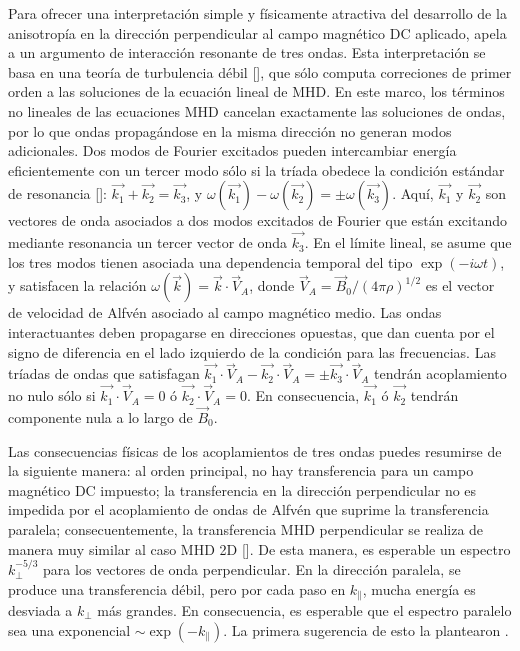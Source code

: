 Para ofrecer una interpretación simple y físicamente atractiva del
desarrollo de la anisotropía en la dirección perpendicular al campo
magnético DC aplicado, \cite{shebalin_anisotropy_1983} apela
a un argumento de interacción resonante de tres ondas. Esta
interpretación se basa en una teoría de turbulencia débil
[\cite{zakharov_kolmogorov_1992}], que sólo computa correciones de
primer orden a las soluciones de la ecuación lineal de MHD. En este
marco, los términos no lineales de las ecuaciones MHD cancelan
exactamente las soluciones de ondas, por lo que ondas propagándose en
la misma dirección no generan modos adicionales. Dos modos de Fourier
excitados pueden intercambiar energía eficientemente con un tercer
modo sólo si la tríada obedece la condición estándar de resonancia
[\cite{montgomery_anisotropic_1995}]: $\vec{k_1} + \vec{k_2} =
\vec{k_3}$, y $\omega(\vec{k_1}) - \omega(\vec{k_2}) = \pm
\omega(\vec{k_3})$. Aquí, $\vec{k_1}$ y $\vec{k_2}$ son vectores de
onda asociados a dos modos excitados de Fourier que están excitando
mediante resonancia un tercer vector de onda $\vec{k_3}$. En el límite
lineal, se asume que los tres modos tienen asociada una dependencia
temporal del tipo $\exp(-i\omega t)$, y satisfacen la relación
$\omega(\vec{k}) = \vec{k}\cdot\vec{V}_A$, donde $\vec{V}_A =
\vec{B}_0/(4\pi\rho)^{1/2}$ es el vector de velocidad de Alfv\'en
asociado al campo magnético medio. Las ondas interactuantes deben
propagarse en direcciones opuestas, que dan cuenta por el signo de
diferencia en el lado izquierdo de la condición para las
frecuencias. Las tríadas de ondas que satisfagan $\vec{k_1}\cdot
\vec{V}_A - \vec{k_2}\cdot \vec{V}_A = \pm \vec{k_3}\cdot \vec{V}_A$
tendrán acoplamiento no nulo sólo si $\vec{k_1}\cdot \vec{V}_A = 0$ ó
$\vec{k_2}\cdot \vec{V}_A = 0$. En consecuencia, $\vec{k_1}$ ó
$\vec{k_2}$ tendrán componente nula a lo largo de $\vec{B}_0$.

Las consecuencias físicas de los acoplamientos de tres ondas puedes
resumirse de la siguiente manera: al orden principal, no hay
transferencia para un campo magnético DC impuesto; la transferencia en
la dirección perpendicular no es impedida por el acoplamiento de ondas
de Alfv\'en que suprime la transferencia paralela; consecuentemente,
la transferencia MHD perpendicular se realiza de manera muy similar al
caso MHD 2D [\cite{fyfe_dissipative_1977}]. De esta manera, es esperable
un espectro $k_\perp^{-5/3}$ para los vectores de onda
perpendicular. En la dirección paralela, se produce una transferencia
débil, pero por cada paso en $k_\parallel$, mucha energía es desviada
a $k_\perp$ más grandes. En consecuencia, es esperable que el espectro
paralelo sea una exponencial $\sim \exp(-k_\parallel)$. La primera
sugerencia de esto la plantearon \cite{montgomery_density_1987}.

